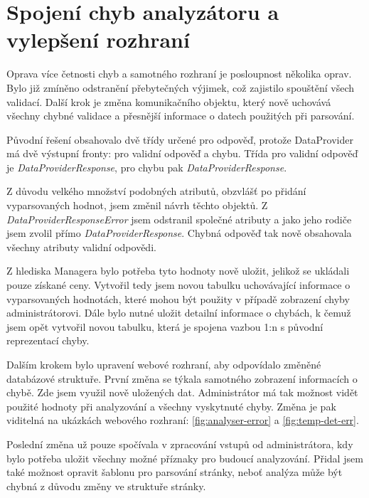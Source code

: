 \documentclass[thesis=B,czech]{FITthesis}[2012/06/26]
\begin{document}
\section{Spojení chyb analyzátoru a vylepšení rozhraní}
Oprava více četnosti chyb a samotného rozhraní je posloupnost několika oprav. 
Bylo již zmíněno odstranění přebytečných výjimek, což zajistilo spouštění všech validací. 
Další krok je změna komunikačního objektu, který nově uchovává všechny chybné validace a přesnější informace
o datech použitých při parsování.
\par
Původní řešení obsahovalo dvě třídy určené pro odpověď, protože DataProvider má dvě výstupní fronty: pro validní odpověď a chybu. 
Třída pro validní odpověď je \textit{DataProviderResponse}, pro chybu pak \textit{DataProviderResponse}.
\par
Z důvodu velkého množství podobných atributů, obzvlášť po přidání vyparsovaných hodnot, jsem změnil návrh těchto objektů.
Z \textit{DataProviderResponseError} jsem odstranil společné atributy a jako jeho rodiče jsem zvolil přímo \textit{DataProviderResponse}.
Chybná odpověď tak nově obsahovala všechny atributy validní odpovědi. 
\par
Z hlediska Managera bylo potřeba tyto hodnoty nově uložit, jelikož se ukládali pouze získané ceny. Vytvořil tedy jsem novou tabulku
uchovávající informace o vyparsovaných hodnotách, které mohou být použity v případě zobrazení chyby administrátorovi.
Dále bylo nutné uložit detailní informace o chybách, k čemuž jsem opět vytvořil novou tabulku, která je spojena vazbou 1:n s původní
reprezentací chyby.
\par
Dalším krokem bylo upravení webové rozhraní, aby odpovídalo změněné databázové struktuře. První změna se týkala samotného zobrazení
informacích o chybě. Zde jsem využil nově uložených dat. Administrátor má tak možnost vidět použité hodnoty při analyzování a všechny
vyskytnuté chyby. Změna je pak viditelná na ukázkách webového rozhraní: \ref{fig:analyser-error} a \ref{fig:temp-det-err}.
\par
Poslední změna už pouze spočívala v zpracování vstupů od administrátora, kdy bylo potřeba uložit všechny možné příznaky pro 
budoucí analyzování. Přidal jsem také možnost opravit šablonu pro parsování stránky, neboť analýza může být chybná z důvodu změny ve struktuře stránky.
\par
\end{document}
